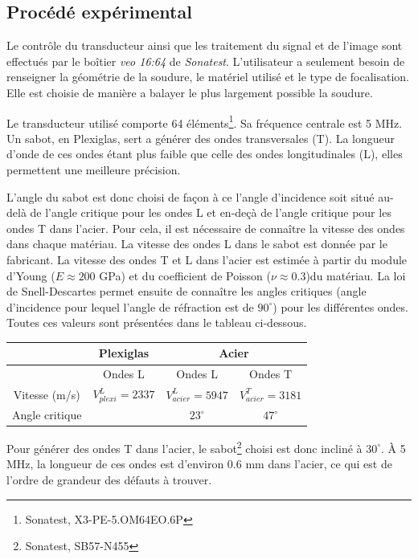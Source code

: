 \documentclass[twoside]{article}
\begin{document}
\begin{multicols}{2}
\subsection{Procédé expérimental}

Le contrôle du transducteur ainsi que les traitement du signal et de l'image sont effectués par le boîtier \textit{veo 16:64} de \textit{Sonatest}. L'utilisateur a seulement besoin de renseigner la géométrie de la soudure, le matériel utilisé et le type de focalisation. Elle est choisie de manière a balayer le plus largement possible la soudure.

Le transducteur utilisé comporte 64 éléments\footnote{Sonatest, X3-PE-5.OM64EO.6P}. Sa fréquence centrale est 5 MHz. Un sabot, en Plexiglas, sert a générer des ondes transversales (T). La longueur d'onde de ces ondes étant plus faible que celle des ondes longitudinales (L), elles permettent une meilleure précision.

L'angle du sabot est donc choisi de façon à ce l'angle d'incidence soit situé au-delà de l'angle critique pour les ondes L et en-deçà de l'angle critique pour les ondes T dans l'acier.
Pour cela, il est nécessaire de connaître la vitesse des ondes dans chaque matériau. La vitesse des ondes L dans le sabot est donnée par le fabricant. La vitesse des ondes T et L dans l'acier est estimée à partir du module d'Young ($E\approx 200$ GPa) et du coefficient de Poisson ($\nu \approx 0.3$)du matériau. La loi de Snell-Descartes permet ensuite de connaître les angles critiques (angle d'incidence pour lequel l'angle de réfraction est de $90^{\circ}$) pour les différentes ondes. Toutes ces valeurs sont présentées dans le tableau ci-dessous.

\begin{center}
	\begin{tabular}{c| c ||c |c }
		& Plexiglas & \multicolumn{2}{c}{Acier} \\ \hline
		& Ondes L & Ondes L & Ondes T \\ \hline
		Vitesse (m/s) & $V_{plexi}^{L}= 2337$ & $V_{acier}^{L}= 5947$ & $V_{acier}^{T}= 3181$ \\ \hline
		Angle critique && $23^{\circ}$ &  $47^{\circ}$\\
	\end{tabular}
\end{center}

Pour générer des ondes T dans l'acier, le sabot\footnote{Sonatest, SB57-N455} choisi est donc incliné à $30^{\circ}$. À 5 MHz, la longueur de ces ondes est d'environ 0.6 mm dans l'acier, ce qui est de l'ordre de grandeur des défauts à trouver.




\end{multicols}
\end{document}
